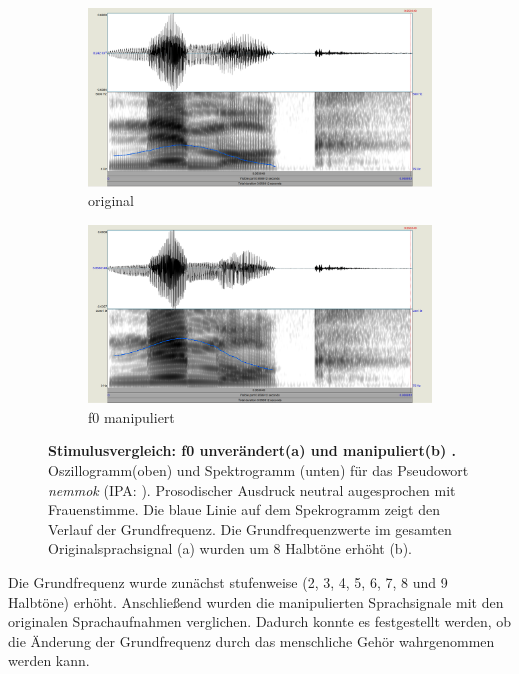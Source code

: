 \documentclass[11pt,a4paper,headsepline,twoside,toc=bibliography]{scrreprt}
\begin{document}
\begin{figure}
	\centering
	\begin{subfigure}{1\textwidth}
		\centering
		\includegraphics[width=1\linewidth]{pics/nemmok.png}
		\caption{original}
		\label{fig:nemmok_original}
	\end{subfigure}
	\par\bigskip
	\begin{subfigure}{1\textwidth}
		\centering
		\includegraphics[width=1\linewidth]{pics/nemmok_pitch.png}
		\caption{f0 manipuliert}
		\label{fig:nemmok_pitch}
	\end{subfigure}
	\caption{\textbf{Stimulusvergleich: f0 unverändert(a) und manipuliert(b) .} Oszillogramm(oben) und Spektrogramm (unten) für das Pseudowort \emph{nemmok} (IPA: ). Prosodischer Ausdruck neutral augesprochen mit Frauenstimme. Die blaue Linie auf dem Spekrogramm zeigt den Verlauf der Grundfrequenz. Die Grundfrequenzwerte im gesamten Originalsprachsignal (a) wurden um 8 Halbtöne erhöht (b). }
	\label{fig:f0_manipulation}
\end{figure}


Die Grundfrequenz wurde zunächst stufenweise (2, 3, 4, 5, 6, 7, 8 und 9 Halbtöne) erhöht. Anschließend wurden die manipulierten Sprachsignale mit den originalen Sprachaufnahmen verglichen. Dadurch konnte es festgestellt werden, ob die Änderung der Grundfrequenz durch das menschliche Gehör wahrgenommen werden kann. \\
\end{document}

